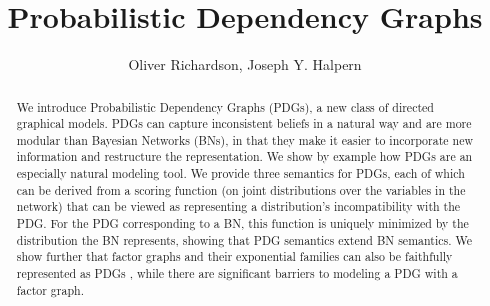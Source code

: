 \documentclass[letterpaper]{article} %
\title{Probabilistic Dependency Graphs}
\author{
Oliver Richardson, Joseph Y. Halpern \\
}
\theoremstyle{plain}
\theoremstyle{definition}
\theoremstyle{remark}
\newif\ifbody\bodytrue
\begin{document}
\ifbody
\maketitle
\begin{abstract}
We introduce Probabilistic Dependency Graphs (PDGs), a new class of
directed graphical models.   PDGs can capture inconsistent beliefs in a
natural way and are more modular than Bayesian Networks (BNs), in that
they make it easier to incorporate new information and restructure the  
representation.    We show by example how PDGs are an especially natural
modeling tool.
We provide three semantics for PDGs, each of which can be derived from a
scoring function (on joint distributions over the
variables in the network) that can be viewed as representing a
distribution's incompatibility with the PDG.
For the PDG corresponding
to a BN, this function is uniquely minimized by the distribution the
BN represents, showing that PDG semantics extend BN semantics.  
We show further that factor graphs
and their exponential families
can also be faithfully represented as PDGs%
, while there are significant barriers to modeling a PDG with a factor graph.
\end{abstract}
\end{document}
